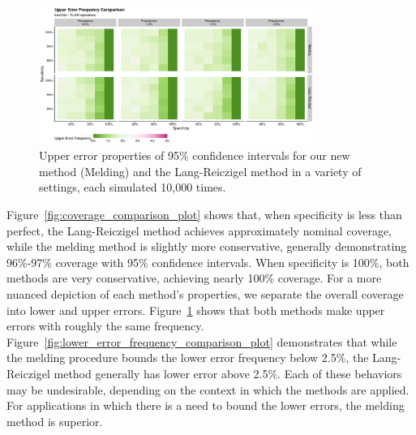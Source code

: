 \documentclass[AMA,STIX1COL]{WileyNJD-v2}
\begin{document}
\begin{figure}
    \centering
    \includegraphics[width=0.8\textwidth]{figures/simple_upper_error_frequency_comparison_plot.pdf}
    \caption{Upper error properties of 95\% confidence intervals for our new method (Melding) and the Lang-Reiczigel method in a variety of settings, each simulated 10,000 times.}
    \label{fig:upper_error_frequency_comparison_plot}
\end{figure}

Figure~\ref{fig:coverage_comparison_plot} shows that, when specificity is less than perfect, the Lang-Reiczigel method achieves approximately nominal coverage, while the melding method is slightly more conservative, generally demonstrating 96\%-97\% coverage with 95\% confidence intervals.
When specificity is 100\%, both methods are very conservative, achieving nearly 100\% coverage.
For a more nuanced depiction of each method's properties, we separate the overall coverage into lower and upper errors.
Figure~\ref{fig:upper_error_frequency_comparison_plot} shows that both methods make upper errors with roughly the same frequency.
Figure~\ref{fig:lower_error_frequency_comparison_plot} demonstrates that while the melding procedure bounds the lower error frequency below 2.5\%, the Lang-Reiczigel method generally has lower error above 2.5\%.
Each of these behaviors may be undesirable, depending on the context in which the methods are applied.
For applications in which there is a need to bound the lower errors, the melding method is superior.
\end{document}
